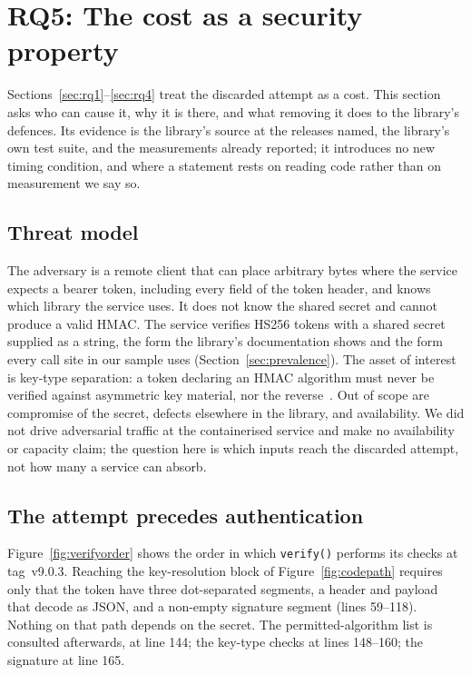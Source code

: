 \documentclass[preprint,12pt,authoryear]{elsarticle}
\newcommand{\LibraryTag}{tag~v9.0.3}
\begin{document}
\section{RQ5: The cost as a security property}\label{sec:security}

Sections~\ref{sec:rq1}--\ref{sec:rq4} treat the discarded attempt as a cost.
This section asks who can cause it, why it is there, and what removing it does
to the library's defences. Its evidence is the library's source at the
releases named, the library's own test suite, and the measurements already
reported; it introduces no new timing condition, and where a statement rests
on reading code rather than on measurement we say so.

\subsection{Threat model}\label{sec:threatmodel}

The adversary is a remote client that can place arbitrary bytes where the
service expects a bearer token, including every field of the token header, and
knows which library the service uses. It does not know the shared secret and
cannot produce a valid HMAC. The service verifies HS256 tokens with a shared
secret supplied as a string, the form the library's documentation shows and
the form every call site in our sample uses (Section~\ref{sec:prevalence}).
The asset of interest is key-type separation: a token declaring an HMAC
algorithm must never be verified against asymmetric key material, nor the
reverse~\citep{rfc8725}. Out of scope are compromise of the secret, defects
elsewhere in the library, and availability. We did not drive adversarial
traffic at the containerised service and make no availability or capacity claim;
the question here is which inputs reach the discarded attempt, not how many a
service can absorb.

\subsection{The attempt precedes authentication}\label{sec:preauth}

Figure~\ref{fig:verifyorder} shows the order in which \texttt{verify()}
performs its checks at \LibraryTag. Reaching the key-resolution block of
Figure~\ref{fig:codepath} requires only that the token have three
dot-separated segments, a header and payload that decode as JSON, and a
non-empty signature segment (lines 59--118). Nothing on that path depends on
the secret. The permitted-algorithm list is consulted afterwards, at line 144;
the key-type checks at lines 148--160; the signature at line 165.
\end{document}
